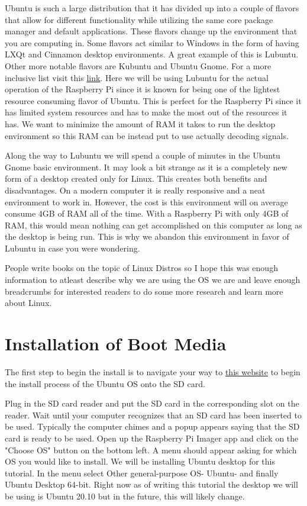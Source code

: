 \documentclass[letterpaper,12pt,notitlepage]{report} %
\begin{document}
Ubuntu is such a large distribution that it has divided up into a couple of flavors that allow for different functionality while utilizing the same core package manager and default applications. These flavors change up the environment that you are computing in. Some flavors act similar to Windows in the form of having LXQt and Cinnamon desktop environments. A great example of this is Lubuntu. Other more notable flavors are Kubuntu and Ubuntu Gnome. For a more inclusive list visit this \href{https://ubuntu.com/download/flavours}{link}. Here we will be using Lubuntu for the actual operation of the Raspberry Pi since it is known for being one of the lightest resource consuming flavor of Ubuntu. This is perfect for the Raspberry Pi since it has limited system resources and has to make the most out of the resources it has. We want to minimize the amount of RAM it takes to run the desktop environment so this RAM can be instead put to use actually decoding signals. 

Along the way to Lubuntu we will spend a couple of minutes in the Ubuntu Gnome basic environment. It may look a bit strange as it is a completely new form of a desktop created only for Linux. This creates both benefits and disadvantages. On a modern computer it is really responsive and a neat environment to work in. However, the cost is this environment will on average consume 4GB of RAM all of the time. With a Raspberry Pi with only 4GB of RAM, this would mean nothing can get accomplished on this computer as long as the desktop is being run. This is why we abandon this environment in favor of Lubuntu in case you were wondering. 

People write books on the topic of Linux Distros so I hope this was enough information to atleast describe why we are using the OS we are and leave enough breadcrumbs for interested readers to do some more research and learn more about Linux. 

\section{Installation of Boot Media}

The first step to begin the install is to navigate your way to \href{https://www.raspberrypi.org/software/}{this website} to begin the install process of the Ubuntu OS onto the SD card.

Plug in the SD card reader and put the SD card in the corresponding slot on the reader. Wait until your computer recognizes that an SD card has been inserted to be used. Typically the computer chimes and a popup appears saying that the SD card is ready to be used. Open up the Raspberry Pi Imager app and click on the "Choose OS" button on the bottom left. A menu should appear asking for which OS you would like to install. We will be installing Ubuntu desktop for this tutorial. In the menu select Other general-purpose OS- Ubuntu- and finally Ubuntu Desktop 64-bit. Right now as of writing this tutorial the desktop we will be using is Ubuntu 20.10 but in the future, this will likely change.
\end{document}
